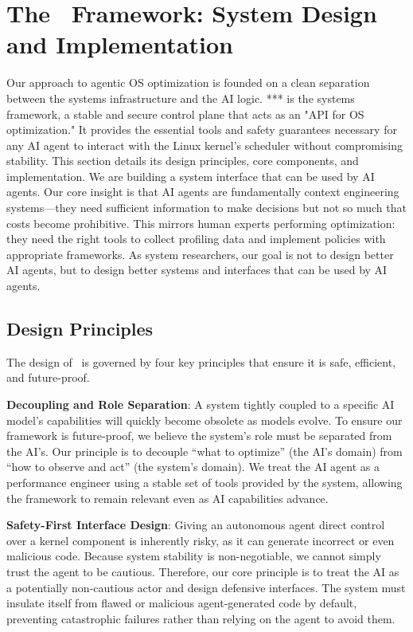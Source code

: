 \section{The \sys\ Framework: System Design and Implementation}
\label{sec:schedcp_framework}

Our approach to agentic OS optimization is founded on a clean separation between the systems infrastructure and the AI logic. **\sys** is the systems framework, a stable and secure control plane that acts as an "API for OS optimization." It provides the essential tools and safety guarantees necessary for any AI agent to interact with the Linux kernel's scheduler without compromising stability. This section details its design principles, core components, and implementation.
We are building a system interface that can be used by AI agents. Our core insight is that AI agents are fundamentally context engineering systems—they need sufficient information to make decisions but not so much that costs become prohibitive. This mirrors human experts performing optimization: they need the right tools to collect profiling data and implement policies with appropriate frameworks. As system researchers, our goal is not to design better AI agents, but to design better systems and interfaces that can be used by AI agents.

\subsection{Design Principles}
The design of \sys\ is governed by four key principles that ensure it is safe, efficient, and future-proof.

\textbf{Decoupling and Role Separation}: A system tightly coupled to a specific AI model's capabilities will quickly become obsolete as models evolve. To ensure our framework is future-proof, we believe the system's role must be separated from the AI's. Our principle is to decouple ``what to optimize'' (the AI's domain) from ``how to observe and act'' (the system's domain). We treat the AI agent as a performance engineer using a stable set of tools provided by the system, allowing the framework to remain relevant even as AI capabilities advance.

\textbf{Safety-First Interface Design}: Giving an autonomous agent direct control over a kernel component is inherently risky, as it can generate incorrect or even malicious code. Because system stability is non-negotiable, we cannot simply trust the agent to be cautious. Therefore, our core principle is to treat the AI as a potentially non-cautious actor and design defensive interfaces. The system must insulate itself from flawed or malicious agent-generated code by default, preventing catastrophic failures rather than relying on the agent to avoid them.

